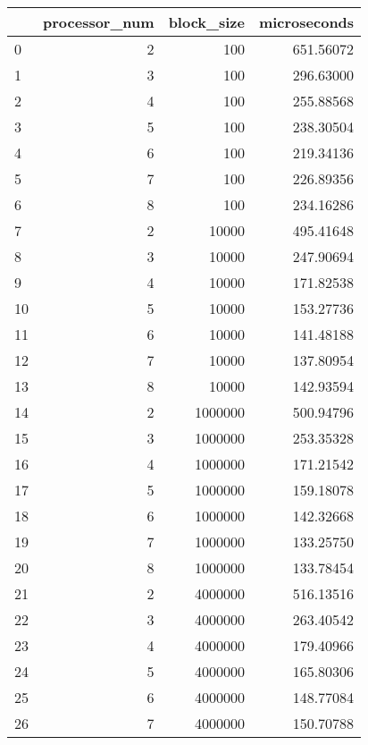 \begin{tabular}{lrrr}
\toprule
{} &  processor\_num &  block\_size &  microseconds \\
\midrule
0  &              2 &         100 &     651.56072 \\
1  &              3 &         100 &     296.63000 \\
2  &              4 &         100 &     255.88568 \\
3  &              5 &         100 &     238.30504 \\
4  &              6 &         100 &     219.34136 \\
5  &              7 &         100 &     226.89356 \\
6  &              8 &         100 &     234.16286 \\
7  &              2 &       10000 &     495.41648 \\
8  &              3 &       10000 &     247.90694 \\
9  &              4 &       10000 &     171.82538 \\
10 &              5 &       10000 &     153.27736 \\
11 &              6 &       10000 &     141.48188 \\
12 &              7 &       10000 &     137.80954 \\
13 &              8 &       10000 &     142.93594 \\
14 &              2 &     1000000 &     500.94796 \\
15 &              3 &     1000000 &     253.35328 \\
16 &              4 &     1000000 &     171.21542 \\
17 &              5 &     1000000 &     159.18078 \\
18 &              6 &     1000000 &     142.32668 \\
19 &              7 &     1000000 &     133.25750 \\
20 &              8 &     1000000 &     133.78454 \\
21 &              2 &     4000000 &     516.13516 \\
22 &              3 &     4000000 &     263.40542 \\
23 &              4 &     4000000 &     179.40966 \\
24 &              5 &     4000000 &     165.80306 \\
25 &              6 &     4000000 &     148.77084 \\
26 &              7 &     4000000 &     150.70788 \\

\end{tabular}
